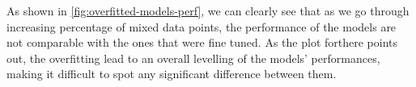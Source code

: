 As shown in \cref{fig:overfitted-models-perf}, we can clearly see that as we go through increasing percentage of mixed data points, the performance of the models are not comparable with the ones that were fine tuned. As the plot forthere points out, the overfitting lead to an overall levelling of the models' performances, making it difficult to spot any significant difference between them.